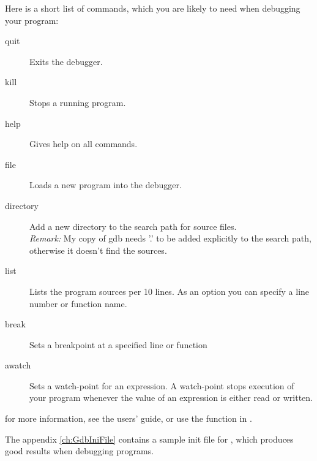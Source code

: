 \documentclass{report}
\begin{document}
Here is a short list of  commands, which you are likely to need when
debugging your program:
\begin{description}
\item [quit\ ] Exits the debugger.
\item [kill\ ] Stops a running program.
\item [help\ ] Gives help on all  commands.
\item [file\ ] Loads a new program into the debugger.
\item [directory\ ] Add a new directory to the search path for source
files.\\
{\em Remark:} My copy of gdb needs '.' to be added explicitly to the search
path, otherwise it doesn't find the sources.
\item [list\ ] Lists the program sources per 10 lines. As an option you can
specify a line number or function name.
\item [break\ ] Sets a breakpoint at a specified line or function
\item [awatch\ ] Sets a watch-point for an expression. A watch-point stops
execution of your program whenever the value of an expression is either 
read or written. 
\end{description}

for more information, see the  users' guide, or use the 
function in .

The appendix {\ref{ch:GdbIniFile}} contains a sample init file for
, which produces good results when debugging \fpc programs.
\end{document}
